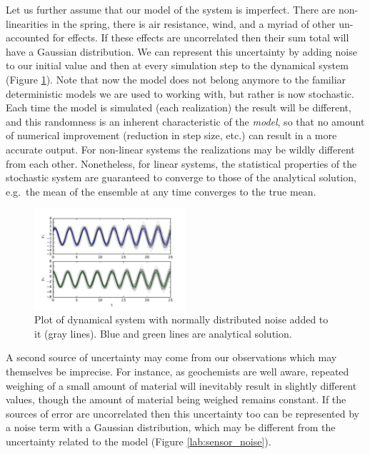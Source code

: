 \documentclass[12pt,oneside]{amsart}
\begin{document}
Let us further assume that our model of the system is imperfect. There are non-linearities in the spring, there is air resistance, wind, and a myriad of other un-accounted for effects. If these effects are uncorrelated then their sum total will have a Gaussian distribution. We can represent this uncertainty by adding noise to our initial value and then at every simulation step to the dynamical system (Figure \ref{fig:stoch_sys}). Note that now the model does not belong anymore to the familiar deterministic models we are used to working with, but rather is now stochastic. Each time the model is simulated (each realization) the result will be different, and this randomness is an inherent characteristic of the \emph{model}, so that no amount of numerical improvement (reduction in step size, etc.) can result in a more accurate output. For non-linear systems the realizations may be wildly different from each other. Nonetheless, for linear systems, the statistical properties of the stochastic system are guaranteed to converge to those of the analytical solution, e.g.\ the mean of the ensemble at any time converges to the true mean. 


\begin{figure}[htbp]
\begin{center}
\includegraphics[width = 0.5\textwidth]{Figures/stoch_system}
\caption{Plot of dynamical system with normally distributed noise added to it (gray lines). Blue and green lines are  analytical solution.}
\label{fig:stoch_sys}
\end{center}
\end{figure}

A second source of uncertainty may come from our observations which may themselves be imprecise. For instance, as geochemists are well aware, repeated weighing of a small amount of material will inevitably result in slightly different values, though the amount of material being weighed remains constant. If the sources of error are uncorrelated then this uncertainty too can be represented by a noise term with a Gaussian distribution, which may be different from the uncertainty related to the model (Figure \ref{lab:sensor_noise}). %
\end{document}
